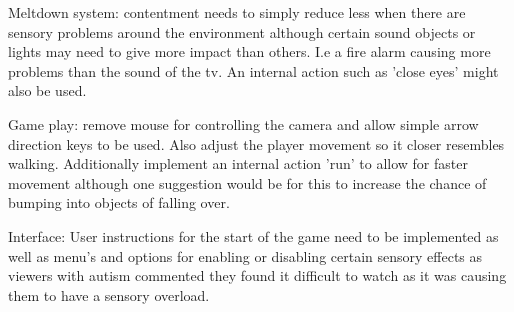 Meltdown system: contentment needs to simply reduce less when there are sensory problems around the environment although certain sound objects or lights may need to give more impact than others. I.e a fire alarm causing more problems than the sound of the tv. An internal action such as 'close eyes' might also be used. 

Game play: remove mouse for controlling the camera and allow simple arrow direction keys to be used. Also adjust the player movement so it closer resembles walking. Additionally implement an internal action 'run' to allow for faster movement although one suggestion would be for this to increase the chance of bumping into objects of falling over. 

Interface: User instructions for the start of the game need to be implemented as well as menu's and options for enabling or disabling certain sensory effects as viewers with autism commented they found it difficult to watch as it was causing them to have a sensory overload. 